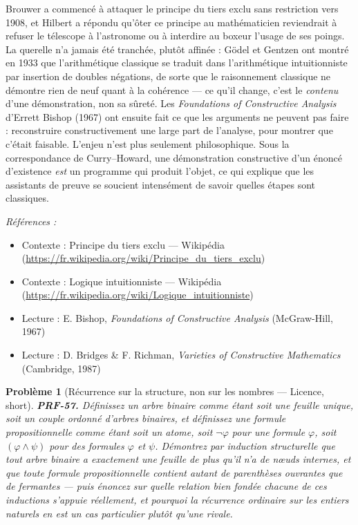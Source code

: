 \documentclass[11pt]{article}
\newtheorem{problem}{Problème}
\newenvironment{refs}{\par\small\noindent\emph{Références :}\begin{itemize}\setlength\itemsep{0pt}}{\end{itemize}\normalsize}
\begin{document}
\noindent Brouwer a commencé à attaquer le principe du tiers exclu sans restriction
vers 1908, et Hilbert a répondu qu'ôter ce principe au mathématicien reviendrait à refuser le
télescope à l'astronome ou à interdire au boxeur l'usage de ses poings. La querelle n'a jamais
été tranchée, plutôt affinée : Gödel et Gentzen ont montré en 1933 que l'arithmétique
classique se traduit dans l'arithmétique intuitionniste par insertion de doubles négations,
de sorte que le raisonnement classique ne démontre rien de neuf quant à la cohérence --- ce
qu'il change, c'est le \textit{contenu} d'une démonstration, non sa sûreté. Les \textit{Foundations
of Constructive Analysis} d'Errett Bishop (1967) ont ensuite fait ce que les arguments ne
peuvent pas faire : reconstruire constructivement une large part de l'analyse, pour montrer
que c'était faisable. L'enjeu n'est plus seulement philosophique. Sous la correspondance de
Curry--Howard, une démonstration constructive d'un énoncé d'existence \textit{est} un programme
qui produit l'objet, ce qui explique que les assistants de preuve se soucient intensément de
savoir quelles étapes sont classiques.

\begin{refs}
\item Contexte : Principe du tiers exclu --- Wikipédia (\url{https://fr.wikipedia.org/wiki/Principe_du_tiers_exclu})
\item Contexte : Logique intuitionniste --- Wikipédia (\url{https://fr.wikipedia.org/wiki/Logique_intuitionniste})
\item Lecture : E. Bishop, \textit{Foundations of Constructive Analysis} (McGraw-Hill, 1967)
\item Lecture : D. Bridges \& F. Richman, \textit{Varieties of Constructive Mathematics} (Cambridge, 1987)
\end{refs}

\bigskip

\begin{problem}[{Récurrence sur la structure, non sur les nombres --- Licence, short}]
\textbf{PRF-57.} Définissez un arbre binaire comme étant soit une
feuille unique, soit un couple ordonné d'arbres binaires, et définissez une formule
propositionnelle comme étant soit un atome, soit $ \neg \varphi $ pour une formule $\varphi$, soit
$ (\varphi \wedge \psi) $ pour des formules $\varphi$ et $\psi$. Démontrez par induction structurelle
que tout arbre binaire a exactement une feuille de plus qu'il n'a de n\oe{}uds internes, et que
toute formule propositionnelle contient autant de parenthèses ouvrantes que de fermantes ---
puis énoncez sur quelle relation bien fondée chacune de ces inductions s'appuie réellement,
et pourquoi la récurrence ordinaire sur les entiers naturels en est un cas particulier
plutôt qu'une rivale.
\end{problem}
\end{document}
